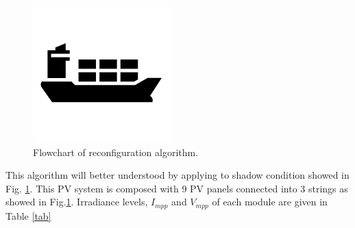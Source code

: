 \documentclass[conference]{IEEEtran}
\begin{document}
\begin{figure}[htbp]
\centerline{\includegraphics{fig1.png}}
\caption{Flowchart of reconfiguration algorithm.}
\label{fig3}
\end{figure}

This algorithm will better understood by applying to shadow condition showed in Fig. \ref{fig3}. This PV system is composed with 9 PV panels connected into 3 strings as showed in Fig.\ref{fig3}. Irradiance levels, \textit{$I_{mpp}$} and \textit{$V_{mpp}$} of each module are given in Table \ref{tab} 
\end{document}
